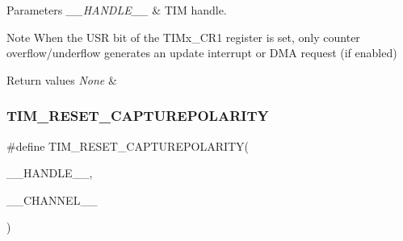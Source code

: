 \begin{DoxyParams}{Parameters}
{\em \+\_\+\+\_\+\+H\+A\+N\+D\+L\+E\+\_\+\+\_\+} & T\+IM handle. \\
\hline
\end{DoxyParams}
\begin{DoxyNote}{Note}
When the U\+SR bit of the T\+I\+Mx\+\_\+\+C\+R1 register is set, only counter overflow/underflow generates an update interrupt or D\+MA request (if enabled) 
\end{DoxyNote}

\begin{DoxyRetVals}{Return values}
{\em None} & \\
\hline
\end{DoxyRetVals}
\mbox{\label{group___t_i_m___exported___macros_gada7535acf7e1f9b3e8e1dcca848871db}} 
\subsubsection{\texorpdfstring{T\+I\+M\+\_\+\+R\+E\+S\+E\+T\+\_\+\+C\+A\+P\+T\+U\+R\+E\+P\+O\+L\+A\+R\+I\+TY}{TIM\_RESET\_CAPTUREPOLARITY}}
{\footnotesize\ttfamily \#define T\+I\+M\+\_\+\+R\+E\+S\+E\+T\+\_\+\+C\+A\+P\+T\+U\+R\+E\+P\+O\+L\+A\+R\+I\+TY(\begin{DoxyParamCaption}\item[{}]{\+\_\+\+\_\+\+H\+A\+N\+D\+L\+E\+\_\+\+\_\+,  }\item[{}]{\+\_\+\+\_\+\+C\+H\+A\+N\+N\+E\+L\+\_\+\+\_\+ }\end{DoxyParamCaption})}

